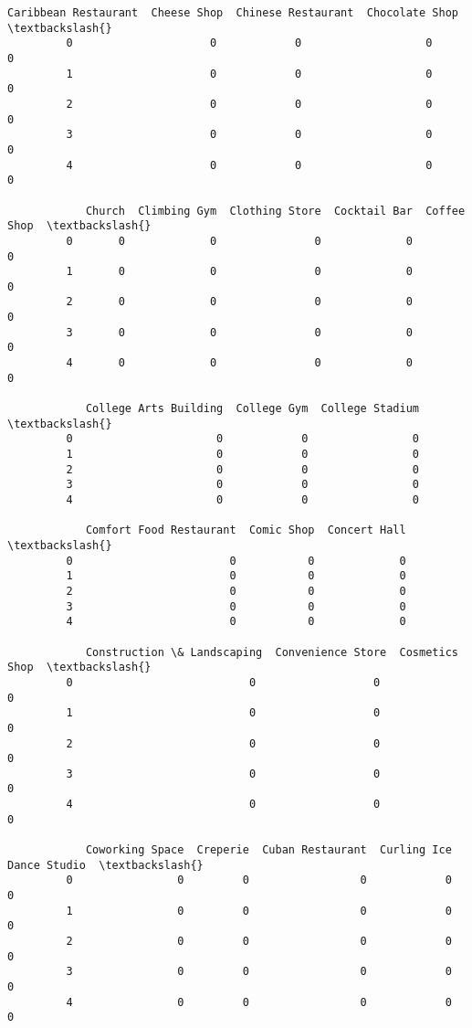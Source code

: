 \documentclass[11pt]{article}
\begin{document}
\begin{Verbatim}[commandchars=\\\{\}]
            Caribbean Restaurant  Cheese Shop  Chinese Restaurant  Chocolate Shop  \textbackslash{}
         0                     0            0                   0               0   
         1                     0            0                   0               0   
         2                     0            0                   0               0   
         3                     0            0                   0               0   
         4                     0            0                   0               0   
         
            Church  Climbing Gym  Clothing Store  Cocktail Bar  Coffee Shop  \textbackslash{}
         0       0             0               0             0            0   
         1       0             0               0             0            0   
         2       0             0               0             0            0   
         3       0             0               0             0            0   
         4       0             0               0             0            0   
         
            College Arts Building  College Gym  College Stadium  \textbackslash{}
         0                      0            0                0   
         1                      0            0                0   
         2                      0            0                0   
         3                      0            0                0   
         4                      0            0                0   
         
            Comfort Food Restaurant  Comic Shop  Concert Hall  \textbackslash{}
         0                        0           0             0   
         1                        0           0             0   
         2                        0           0             0   
         3                        0           0             0   
         4                        0           0             0   
         
            Construction \& Landscaping  Convenience Store  Cosmetics Shop  \textbackslash{}
         0                           0                  0               0   
         1                           0                  0               0   
         2                           0                  0               0   
         3                           0                  0               0   
         4                           0                  0               0   
         
            Coworking Space  Creperie  Cuban Restaurant  Curling Ice  Dance Studio  \textbackslash{}
         0                0         0                 0            0             0   
         1                0         0                 0            0             0   
         2                0         0                 0            0             0   
         3                0         0                 0            0             0   
         4                0         0                 0            0             0   
         

\end{Verbatim}
\end{document}
